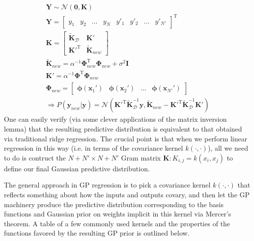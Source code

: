 \documentclass[a4paper]{article}
\begin{document}
\begin{gather*}
\mathbf{Y} \sim \mathcal{N}(\mathbf{0},\mathbf{K}) \\
\mathbf{Y}=\begin{bmatrix} y_1 & y_2 & \ldots & y_N & y'_1 & y'_2 & \ldots & y'_{N'}\end{bmatrix}^\textrm{T} \\
\mathbf{K} = 
\begin{bmatrix}
\tilde{\mathbf{K}}_\mathcal{D} & \mathbf{K}' \\
{\mathbf{K}'}^\textrm{T} & \tilde{\mathbf{K}}_{new}
\end{bmatrix} \\
\tilde{\mathbf{K}}_{new}=\alpha^{-1}\mathbf{\Phi}_{new}^\textrm{T}\mathbf{\Phi}_{new}+\sigma^2\mathbf{I} \\
\mathbf{K}' = \alpha^{-1}\mathbf{\Phi}^\textrm{T}\mathbf{\Phi}_{new} \\
\mathbf{\Phi}_{new}=\begin{bmatrix} \mathbf{\phi}\left(\mathbf{x}_1'\right) & \mathbf{\phi}\left(\mathbf{x}_2'\right) & \ldots & \mathbf{\phi}\left(\mathbf{x}_{N'}'\right)\end{bmatrix} \\
\Rightarrow P(\mathbf{y}_{new}|\mathbf{y}) = \mathcal{N}({\mathbf{K}'}^\textrm{T}\tilde{\mathbf{K}}_\mathcal{D}^{-1}\mathbf{y},\tilde{\mathbf{K}}_{new}-{\mathbf{K}'}^\textrm{T}\tilde{\mathbf{K}}_\mathcal{D}^{-1}\mathbf{K}')
\end{gather*}
One can easily verify (via some clever applications of the matrix inversion lemma) that the resulting predictive distribution is equivalent to that obtained via traditional ridge regression. The crucial point is that when we perform linear regression in this way (i.e. in terms of the covariance kernel $k(\cdot,\cdot)$), all we need to do is contruct the $N+N' \times N+N'$ Gram matrix $\mathbf{K}:K_{i,j} = k(x_i,x_j)$ to define our final Gaussian predictive distribution.

The general approach in GP regression is to pick a covariance kernel $k(\cdot,\cdot)$ that reflects something about how the inputs and outputs covary, and then let the GP machinery produce the predictive distribution corresponding to the basis functions and Gaussian prior on weights implicit in this kernel via Mercer's theorem. A table of a few commonly used kernels and the properties of the functions favored by the resulting GP prior is outlined below.
\end{document}
